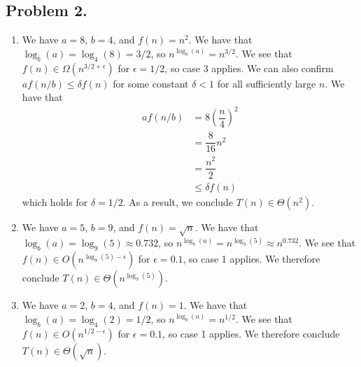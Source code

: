 \documentclass[11pt, letterpaper, titlepage]{article}
\begin{document}
\newpage

\subsection*{Problem 2.}
\begin{enumerate}[label=\alph*)]
    \item We have $a = 8$, $b = 4$, and $f(n) = n^2$. We have that $\log_b(a) = \log_4(8) = 3/2$, so $n^{\log_b(a)} = n^{3/2}$. We see that $f(n) \in \Omega(n^{3/2 + \epsilon})$ for $\epsilon = 1/2$, so case 3 applies. We can also confirm $af(n/b) \leq \delta f(n)$ for some constant $\delta < 1$ for all sufficiently large $n$. We have that 
    \begin{align}
        af(n/b) &= 8\left( \dfrac{n}{4} \right) ^ 2 \\
        &= \dfrac{8}{16}n^2 \\
        &= \dfrac{n^2}{2} \\
        &\leq \delta f(n)
    \end{align}
    which holds for $\delta = 1/2$. As a result, we conclude $T(n) \in \Theta(n^2)$.

    \item We have $a = 5$, $b = 9$, and $f(n) = \sqrt{n}$. We have that $\log_b(a) = \log_9(5) \approx 0.732$, so $n^{\log_b(a)} = n^{\log_9(5)} \approx n^{0.732}$. We see that $f(n) \in O(n^{\log_9(5) - \epsilon})$ for $\epsilon = 0.1$, so case 1 applies. We therefore conclude $T(n) \in \Theta(n^{\log_9(5)})$.
    
    \item We have $a = 2$, $b = 4$, and $f(n) = 1$. We have that $\log_b(a) = \log_4(2) = 1/2$, so $n^{\log_b(a)} = n^{1/2}$. We see that $f(n) \in O(n^{1/2 - \epsilon})$ for $\epsilon = 0.1$, so case 1 applies. We therefore conclude $T(n) \in \Theta(\sqrt{n})$.
    

\end{enumerate}
\end{document}
